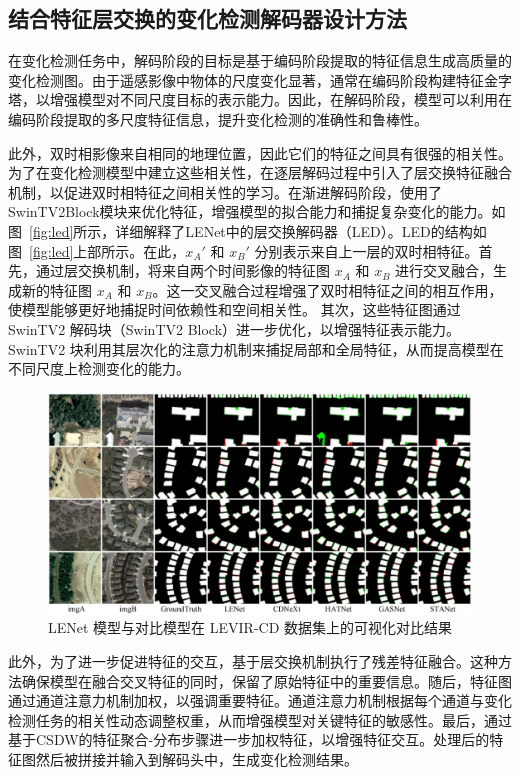 \subsection{结合特征层交换的变化检测解码器设计方法}
在变化检测任务中，解码阶段的目标是基于编码阶段提取的特征信息生成高质量的变化检测图。由于遥感影像中物体的尺度变化显著，通常在编码阶段构建特征金字塔，以增强模型对不同尺度目标的表示能力。因此，在解码阶段，模型可以利用在编码阶段提取的多尺度特征信息，提升变化检测的准确性和鲁棒性。

此外，双时相影像来自相同的地理位置，因此它们的特征之间具有很强的相关性。为了在变化检测模型中建立这些相关性，在逐层解码过程中引入了层交换特征融合机制，以促进双时相特征之间相关性的学习。在渐进解码阶段，使用了SwinTV2Block模块来优化特征，增强模型的拟合能力和捕捉复杂变化的能力。如图~\ref{fig:led}所示，详细解释了LENet中的层交换解码器（LED）。LED的结构如图~\ref{fig:led}上部所示。在此，$x_A'$ 和 $x_B'$ 分别表示来自上一层的双时相特征。首先，通过层交换机制，将来自两个时间影像的特征图 $x_A$ 和 $x_B$ 进行交叉融合，生成新的特征图 $x_A$ 和 $x_B$。这一交叉融合过程增强了双时相特征之间的相互作用，使模型能够更好地捕捉时间依赖性和空间相关性。 其次，这些特征图通过 SwinTV2 解码块（SwinTV2 Block）进一步优化，以增强特征表示能力。SwinTV2 块利用其层次化的注意力机制来捕捉局部和全局特征，从而提高模型在不同尺度上检测变化的能力。  

\begin{figure}[!htb]
  \centering
  \includegraphics[width=\textwidth]{paper_figures/基于双时相遥感影像特征交互的变化检测算法研究/LENet/lenet_levir.png}
  \caption{LENet 模型与对比模型在 LEVIR-CD 数据集上的可视化对比结果}
  \label{fig:lenet_levir}
\end{figure}

此外，为了进一步促进特征的交互，基于层交换机制执行了残差特征融合。这种方法确保模型在融合交叉特征的同时，保留了原始特征中的重要信息。随后，特征图通过通道注意力机制加权，以强调重要特征。通道注意力机制根据每个通道与变化检测任务的相关性动态调整权重，从而增强模型对关键特征的敏感性。最后，通过基于CSDW的特征聚合-分布步骤进一步加权特征，以增强特征交互。处理后的特征图然后被拼接并输入到解码头中，生成变化检测结果。

